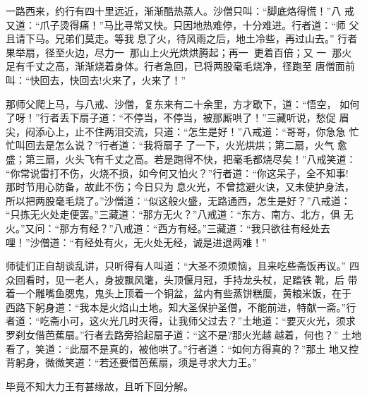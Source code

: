 一路西来，约行有四十里远近，渐渐酷热蒸人。沙僧只叫：“脚底烙得慌！”八
戒又道：“爪子烫得痛！”马比寻常又快。只因地热难停，十分难进。行者道：“师
父且请下马。兄弟们莫走。等我息了火，待风雨之后，地土冷些，再过山去。”
行者果举扇，径至火边，尽力一，那山上火光烘烘腾起；再一，更着百倍；又
一，那火足有千丈之高，渐渐烧着身体。行者急回，已将两股毫毛烧净，径跑至
唐僧面前叫：“快回去，快回去!火来了，火来了！”

那师父爬上马，与八戒、沙僧，复东来有二十余里，方才歇下，道：“悟空，
如何了呀！”行者丢下扇子道：“不停当，不停当，被那厮哄了！”三藏听说，愁促
眉尖，闷添心上，止不住两泪交流，只道：“怎生是好！”八戒道：“哥哥，你急急
忙忙叫回去是怎么说？”行者道：“我将扇子了一下，火光烘烘；第二扇，火气
愈盛；第三扇，火头飞有千丈之高。若是跑得不快，把毫毛都烧尽矣！”八戒笑道：
“你常说雷打不伤，火烧不损，如今何又怕火？”行者道：“你这呆子，全不知事!
那时节用心防备，故此不伤；今日只为息火光，不曾捻避火诀，又未使护身法，
所以把两股毫毛烧了。”沙僧道：“似这般火盛，无路通西，怎生是好？”八戒道：
“只拣无火处走便罢。”三藏道：“那方无火？”八戒道：“东方、南方、北方，俱
无火。”又问：“那方有经？”八戒道：“西方有经。”三藏道：“我只欲往有经处去
哩！”沙僧道：“有经处有火，无火处无经，诚是进退两难！”

师徒们正自胡谈乱讲，只听得有人叫道：“大圣不须烦恼，且来吃些斋饭再议。”
四众回看时，见一老人，身披飘风氅，头顶偃月冠，手持龙头杖，足踏铁靴，后
带着一个雕嘴鱼腮鬼，鬼头上顶着一个铜盆，盆内有些蒸饼糕糜，黄粮米饭，在于
西路下躬身道：“我本是火焰山土地。知大圣保护圣僧，不能前进，特献一斋。”行
者道：“吃斋小可，这火光几时灭得，让我师父过去？”土地道：“要灭火光，须求
罗刹女借芭蕉扇。”行者去路旁拾起扇子道：“这不是?那火光越越着，何也？”
土地看了，笑道：“此扇不是真的，被他哄了。”行者道：“如何方得真的？”那土
地又控背躬身，微微笑道：“若还要借芭蕉扇，须是寻求大力王。”

毕竟不知大力王有甚缘故，且听下回分解。